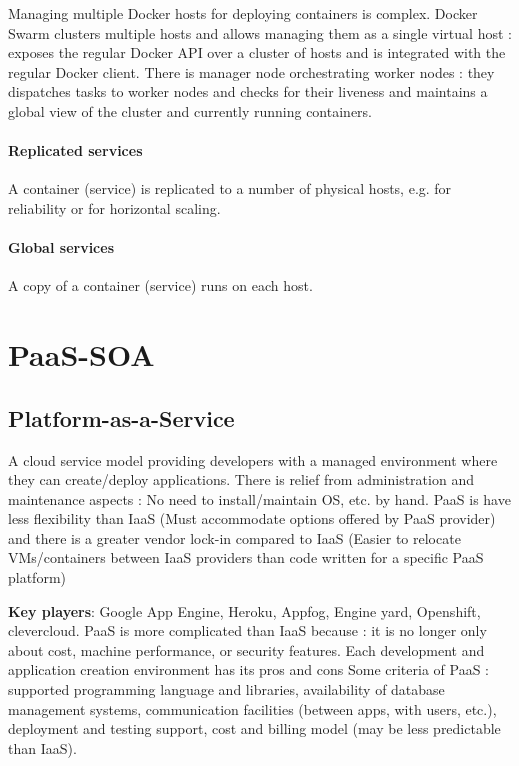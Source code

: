 Managing multiple Docker hosts for deploying containers is complex. Docker Swarm clusters multiple hosts and allows managing them as a single virtual host : exposes the regular Docker API over a cluster of hosts and is integrated with the regular Docker client. There is manager node orchestrating worker nodes : they dispatches tasks to worker nodes and checks for their liveness and maintains a global view of the cluster and currently running containers.

\subsubsection{Replicated services}

A container (service) is replicated to a number of physical hosts, e.g. for reliability or for horizontal scaling.

\subsubsection{Global services}

A copy of a container (service) runs on each host.

\chapter{PaaS-SOA}

\section{Platform-as-a-Service}

A cloud service model providing developers with a managed environment where they can create/deploy applications. There is relief from administration and maintenance aspects : No need to install/maintain OS, etc. by hand. PaaS is have less flexibility than IaaS (Must accommodate options offered by PaaS provider) and there is a greater vendor lock-in compared to IaaS (Easier to relocate VMs/containers between IaaS providers than code written for a specific PaaS platform)

\textbf{Key players}: Google App Engine, Heroku, Appfog, Engine yard, Openshift, clevercloud. PaaS is more complicated than IaaS because : it is no longer only about cost, machine performance, or security features. Each development and application creation environment has its pros and cons Some criteria of PaaS : supported programming language and libraries, availability of database management systems, communication facilities (between apps, with users, etc.), deployment and testing support, cost and billing model (may be less predictable than IaaS).

